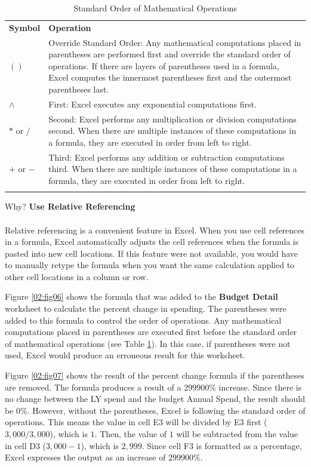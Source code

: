 \begin{longtable}{p{0.85in}p{2.8in}}
	\textbf{Symbol} & \textbf{Operation} \endhead
	\hline \\
	$ () $ & Override Standard Order: Any mathematical computations placed in parentheses are performed first and override the standard order of operations. If there are layers of parentheses used in a formula, Excel computes the innermost parentheses first and the outermost parentheses last.\\
	$ \wedge $ & First: Excel executes any exponential computations first.\\
	$ * $ or $ / $ & Second: Excel performs any multiplication or division computations second. When there are multiple instances of these 	computations in a formula, they are executed in order from left to right.\\
	$ + $ or $ - $ & Third: Excel performs any addition or subtraction computations third. When there are multiple instances of these 	computations in a formula, they are executed in order from left to right.\\
	\hline
	\caption{Standard Order of Mathematical Operations}
	\label{02:tab03}
\end{longtable}

\begin{center}
	\begin{infobox}{Why?}
		\textbf{Use Relative Referencing}
		\\
		\\
		Relative referencing is a convenient feature in Excel. When you use cell references in a formula, Excel automatically adjusts the cell references when the formula is pasted into new cell locations. If this feature were not available, you would have to manually retype the formula when you want the same calculation applied to other cell locations in a column or row.
	\end{infobox}
\end{center}

Figure \ref{02:fig06} shows the formula that was added to the \textbf{Budget Detail} worksheet to calculate the percent change in spending. The parentheses were added to this formula to control the order of operations. Any mathematical computations placed in parentheses are executed first before the standard order of mathematical operations (see Table \ref{02:tab03}). In this case, if parentheses were not used, Excel would produce an erroneous result for this worksheet.

Figure \ref{02:fig07} shows the result of the percent change formula if the parentheses are removed. The formula produces a result of a $ 299900\% $ increase. Since there is no change between the LY spend and the budget Annual Spend, the result should be 0\%. However, without the parentheses, Excel is following the standard order of operations. This means the value in cell \textsf{E3} will be divided by \textsf{E3} first ($ 3,000 / 3,000 $), which is $ 1 $. Then, the value of $ 1 $ will be subtracted from the value in cell \textsf{D3} ($ 3,000 - 1 $), which is $ 2,999 $. Since cell \textsf{F3} is formatted as a percentage, Excel expresses the output as an increase of $ 299900\% $.

